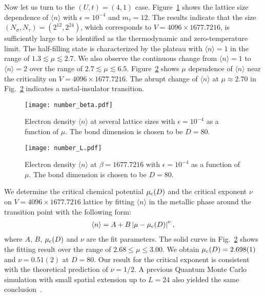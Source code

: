 \documentclass[nofootinbib,prd,aps,superscriptaddress,preprintnumbers,twocolumn,showpacs]{revtex4-1}
\begin{document}
Now let us turn to the $(U,t)=(4,1)$ case.
Figure~\ref{fig:edensity_beta} shows the lattice size dependence of $\langle n\rangle$ with $\epsilon=10^{-4}$ and $m_{\tau}=12$. The results indicate that the size $(N_{\sigma},N_{\tau})=(2^{12},2^{24})$, which corresponds to $V=4096\times 1677.7216$, is sufficiently large to be identified as the thermodynamic and zero-temperature limit. The half-filling state is characterized by the plateau with $\langle n\rangle=1$ in the range of $1.3\lesssim \mu\lesssim 2.7$. We also observe the continuous change from $\langle n\rangle=1$ to $\langle n\rangle=2$ over the range of $2.7\lesssim \mu\lesssim 6.5$.
Figure~\ref{fig:edensity} shows $\mu$ dependence of $\langle n\rangle$ near the criticality on $V=4096\times 1677.7216$. The abrupt change of $\langle n\rangle$ at $\mu\approx 2.70$ in Fig.~\ref{fig:edensity} indicates a metal-insulator transition. 

\begin{figure}[htbp]
  	\centering
	\texttt{[image: number\_beta.pdf]}
	\caption{Electron density $\langle n\rangle$ at several lattice sizes with $\epsilon=10^{-4}$ as a function of $\mu$. The bond dimension is chosen to be $D=80$.}
  	\label{fig:edensity_beta}
\end{figure}

%
\begin{figure}[htbp]
  	\centering
	\texttt{[image: number\_L.pdf]}
	\caption{Electron density $\langle n\rangle$ at $\beta=1677.7216$ with $\epsilon=10^{-4}$ as a function of $\mu$. The bond dimension is chosen to be $D=80$.}
  	\label{fig:edensity}
\end{figure}

We determine the critical chemical potential $\mu_{\rm c}(D)$ and the critical exponent $\nu$ on $V=4096\times 1677.7216$ lattice by fitting $\langle n\rangle$ in the metallic phase around the transition point with the following form:
\begin{align}
	\langle n\rangle=A+B\left|\mu-\mu_{\rm c}(D)\right|^\nu,
\end{align}
where $A$, $B$, $\mu_{\rm c}(D)$ and $\nu$ are the fit parameters.
The solid curve in Fig.~\ref{fig:edensity} shows the fitting result over the range of $2.68\le \mu\le 3.00$. We obtain $\mu_{\rm c}(D)=2.698(1)$ and $\nu= 0.51(2)$ at $D=80$.  Our result for the critical exponent is consistent with the theoretical prediction of $\nu=1/2$. A previous Quantum Monte Carlo simulation with small spatial extension up to $L=24$ also yielded the same conclusion~\cite{PhysRevLett.76.3176}.
\end{document}
